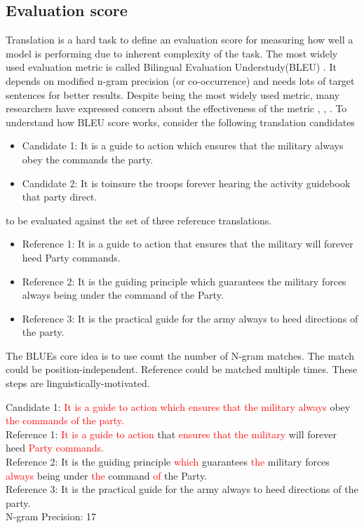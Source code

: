 \documentclass[a4paper]{article}
\newcommand{\red}[1]{\textcolor{red}{#1}}
\begin{document}
\subsection{Evaluation score} Translation is a hard task to define an evaluation
score for measuring how  well a model  is performing due to inherent complexity of
the task. The most widely  used evaluation metric is called Bilingual Evaluation
Understudy(BLEU) \cite{papineni2002bleu}. It depends on  modified n-gram precision
(or  co-occurrence) and needs  lots of target sentences for better results. Despite
being the most widely used metric, many researchers have expressed concern about
the    effectiveness     of     the     metric     \cite{zhang2004interpreting},
\cite{callison2006re}, \cite{ananthakrishnan2007some}. To understand how BLEU score works, consider  the  following
translation candidates


\begin{itemize}
  \item Candidate 1: It is  a  guide to action which ensures that  the  military
        always obey  the commands the  party.
  \item Candidate 2: It is  toinsure the troops  forever  hearing  the  activity
        guidebook that party  direct.
\end{itemize}


to be evaluated against the set of three reference translations.


\begin{itemize}
  \item Reference 1: It is a guide to action that ensures that the military will
        forever heed Party commands.
  \item Reference 2: It is the  guiding  principle which guarantees the military
        forces always being under the command of the Party.
  \item Reference 3: It  is  the  practical  guide  for  the army always to heed
        directions of the party.
\end{itemize}


The  BLUEs core idea is to use  count the  number  of N-gram  matches. The match
could  be position-independent. Reference could be matched multiple times. These
steps are linguistically-motivated.


Candidate  1:  \red{It is  a  guide to action which  ensures  that  the military
always} obey \red{the commands of the party}. \\
Reference 1: \red{It is a guide  to action} that \red{ensures that the military}
will forever heed \red{Party commands}. \\
Reference  2:  It  is  the  guiding principle  \red{which}  guarantees \red{the}
military forces \red{always}  being under  \red{the} command \red{of} the Party.
\\
Reference 3: It is the practical guide for the army always to heed directions of
the party. \\
N-gram Precision: 17
\end{document}
